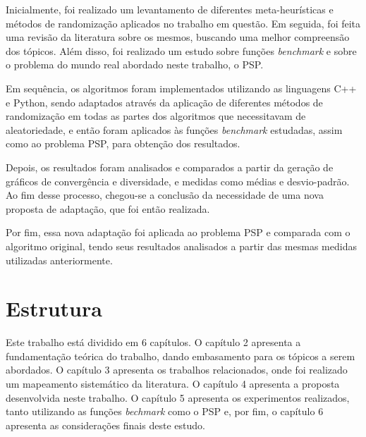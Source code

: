 Inicialmente, foi realizado um levantamento de diferentes meta-heurísticas e métodos de randomização aplicados no trabalho em questão. Em seguida, foi feita uma revisão da literatura sobre os mesmos, buscando uma melhor compreensão dos tópicos. Além disso, foi realizado um estudo sobre funções \textit{benchmark} e sobre o problema do mundo real abordado neste trabalho, o PSP.

Em sequência, os algoritmos foram implementados utilizando as linguagens C++ e Python, sendo adaptados através da aplicação de diferentes métodos de randomização em todas as partes dos algoritmos que necessitavam de aleatoriedade, e então foram aplicados às funções \textit{benchmark} estudadas, assim como ao problema PSP, para obtenção dos resultados.

Depois, os resultados foram analisados e comparados a partir da geração de gráficos de convergência e diversidade, e medidas como médias e desvio-padrão. Ao fim desse processo, chegou-se a conclusão da necessidade de uma nova proposta de adaptação, que foi então realizada.

Por fim, essa nova adaptação foi aplicada ao problema PSP e comparada com o algoritmo original, tendo seus resultados analisados a partir das mesmas medidas utilizadas anteriormente.

\section{Estrutura}

Este trabalho está dividido em 6 capítulos. O capítulo 2 apresenta a fundamentação teórica do trabalho, dando embasamento para os tópicos a serem abordados. O capítulo 3 apresenta os trabalhos relacionados, onde foi realizado um mapeamento sistemático da literatura. O capítulo 4 apresenta a proposta desenvolvida neste trabalho. O capítulo 5 apresenta os experimentos realizados, tanto utilizando as funções \textit{bechmark} como o PSP e, por fim, o capítulo 6 apresenta as considerações finais deste estudo.


